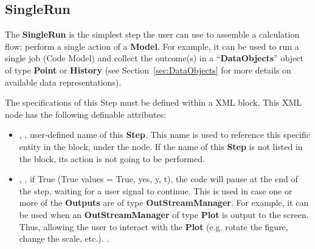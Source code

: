 \subsection{SingleRun}
\label{subsec:stepSingleRun}
The \textbf{SingleRun} is the simplest step the user can use to assemble a
calculation flow: perform a single action of a \textbf{Model}.
%
For example, it can be used to run a single job (Code Model) and collect the
outcome(s) in a ``\textbf{DataObjects}'' object of type \textbf{Point} or 
\textbf{History} (see Section~\ref{sec:DataObjects} for more details on available data
representations).

The specifications of this Step must be defined within a  XML
block.
%
This XML node has the following definable attributes:
\vspace{-5mm}
\begin{itemize}
\itemsep0em
\item {}, , user-defined name of
this \textbf{Step}. \nb This name is used to reference this specific entity
in the  block, under the  node. If the name 
of this \textbf{Step} is not listed in the   block, its action is not
going to be performed.
\item {}, , if True
(True values = True, yes, y, t), the code will pause at the end of
the step, waiting for a user signal to continue. This is used in case one or
more of the \textbf{Outputs} are of type \textbf{OutStreamManager}.
For example, it can be used when an \textbf{OutStreamManager} of type
\textbf{Plot} is output to the screen. Thus, allowing the user to interact with
the \textbf{Plot} (e.g. rotate the figure, change the scale, etc.).
.
\end{itemize}


